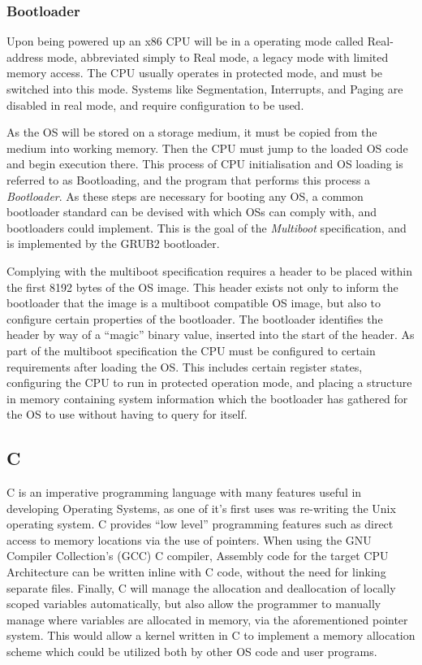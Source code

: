\documentclass[10pt]{report}
\begin{document}
\subsubsection{Bootloader} \label{sec:bootloader}
Upon being powered up an x86 CPU will be in a operating mode called Real-address mode, abbreviated simply to Real mode, a legacy mode with limited memory access. The CPU usually operates in protected mode, and must be switched into this mode. Systems like Segmentation, Interrupts, and Paging are disabled in real mode, and require configuration to be used\cite{guide2011intel}.

As the OS will be stored on a storage medium, it must be copied from the medium into working memory. Then the CPU must jump to the loaded OS code and begin execution there. This process of CPU initialisation and OS loading is referred to as Bootloading, and the program that performs this process a \textit{Bootloader}. As these steps are necessary for booting any OS, a common bootloader standard can be devised with which OSs can comply with, and bootloaders could implement. This is the goal of the \textit{Multiboot} specification\cite{multiboot-spec}, and is implemented by the GRUB2 bootloader\cite{grub2-manual}.

Complying with the multiboot specification requires a header to be placed within the first 8192 bytes of the OS image\cite{multiboot-spec}. This header exists not only to inform the bootloader that the image is a multiboot compatible OS image, but also to configure certain properties of the bootloader. The bootloader identifies the header by way of a ``magic'' binary value, inserted into the start of the header. As part of the multiboot specification the CPU must be configured to certain requirements after loading the OS. This includes certain register states, configuring the CPU to run in protected operation mode, and placing a structure in memory containing system information which the bootloader has gathered for the OS to use without having to query for itself.

\subsection{C}
C is an imperative programming language with many features useful in developing Operating Systems, as one of it's first uses was re-writing the Unix operating system\cite{10.1145/154766.155580}. C provides ``low level'' programming features such as direct access to memory locations via the use of pointers. When using the GNU Compiler Collection's (GCC) C compiler, Assembly code for the target CPU Architecture can be written inline with C code, without the need for linking separate files. Finally, C will manage the allocation and deallocation of locally scoped variables automatically, but also allow the programmer to manually manage where variables are allocated in memory, via the aforementioned pointer system. This would allow a kernel written in C to implement a memory allocation scheme which could be utilized both by other OS code and user programs.
\end{document}
